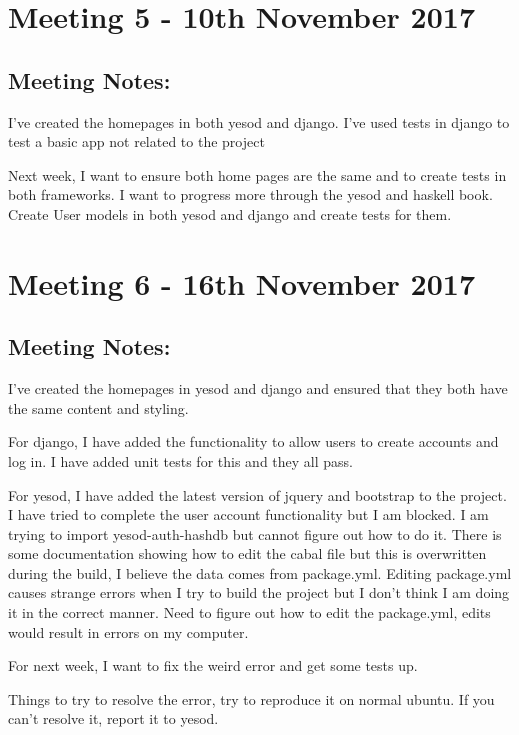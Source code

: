 \documentclass[a4paper,11pt]{article}
\begin{document}
\section{Meeting 5 - 10th November 2017}

\subsection{Meeting Notes:}

I’ve created the homepages in both yesod and django. I’ve used tests in django to test a basic app not related to the project

Next week, I want to ensure both home pages are the same and to create tests in both frameworks. I want to progress more through the yesod and haskell book.
Create User models in both yesod and django and create tests for them.

\section{Meeting 6 - 16th November 2017}

\subsection{Meeting Notes:}

I’ve created the homepages in yesod and django and ensured that they both have the same content and styling.

For django, I have added the functionality to allow users to create accounts and log in. I have added unit tests for this and they all pass.

For yesod, I have added the latest version of jquery and bootstrap to the project. I have tried to complete the user account functionality but I am blocked. I am trying to import yesod-auth-hashdb but cannot figure out how to do it. There is some documentation showing how to edit the cabal file but this is overwritten during the build, I believe the data comes from package.yml. Editing package.yml causes strange errors when I try to build the project but I don’t think I am doing it in the correct manner. Need to figure out how to edit the package.yml, edits would result in errors on my computer.

For next week, I want to fix the weird error and get some tests up.

Things to try to resolve the error, try to reproduce it on normal ubuntu. If you can’t resolve it, report it to yesod.
\end{document}

